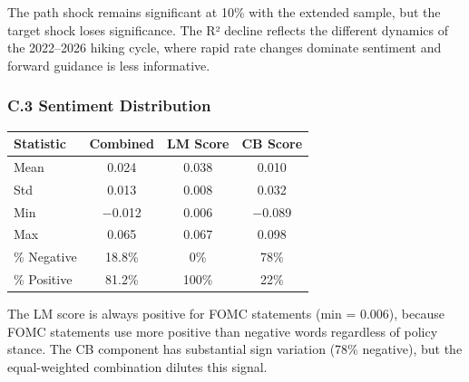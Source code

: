 \documentclass[
]{article}
\begin{document}
The path shock remains significant at 10\% with the extended sample, but
the target shock loses significance. The R² decline reflects the
different dynamics of the 2022--2026 hiking cycle, where rapid rate
changes dominate sentiment and forward guidance is less informative.

\subsubsection{C.3 Sentiment
Distribution}\label{c.3-sentiment-distribution}

\begin{longtable}[]{@{}lccc@{}}
\toprule\noalign{}
Statistic & Combined & LM Score & CB Score \\
\midrule\noalign{}
\endhead
\bottomrule\noalign{}
\endlastfoot
Mean & 0.024 & 0.038 & 0.010 \\
Std & 0.013 & 0.008 & 0.032 \\
Min & −0.012 & 0.006 & −0.089 \\
Max & 0.065 & 0.067 & 0.098 \\
\% Negative & 18.8\% & 0\% & 78\% \\
\% Positive & 81.2\% & 100\% & 22\% \\
\end{longtable}

The LM score is always positive for FOMC statements (min = 0.006),
because FOMC statements use more positive than negative words regardless
of policy stance. The CB component has substantial sign variation (78\%
negative), but the equal-weighted combination dilutes this signal.
\end{document}
